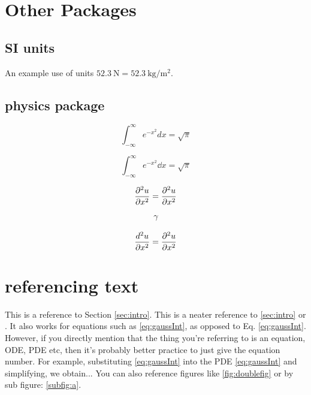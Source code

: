 \documentclass[
 reprint, %
 amsmath, amssymb, aps, %
 a4paper,
]{revtex4-2}
\begin{document}
\section{Other Packages}


\subsection{SI units}
An example use of units $\SI{52.3}{\newton}=\SI{52.3}{\kg\per\meter\squared}$.

\subsection{physics package}
\newpage
\begin{equation}
    \int_{-\infty}^\infty e^{-x^2} d x = \sqrt{\pi} \label{eq:gaussInt}
\end{equation}

\begin{equation}
    \int_{-\infty}^\infty e^{-x^2} \dd x = \sqrt{\pi}
\end{equation}

\begin{equation}
    \frac{\partial^2u}{\partial x^2} = \pdv[2]{u}{x} \label{eq:partialDiffExample}
\end{equation}

\newcommand{\myvariable}{\gamma}

\begin{align}
    \myvariable
\end{align}

\begin{equation}
    \frac{d ^2u}{\partial x^2} = \pdv[2]{u}{x} \label{eq:partialDiffExample}
\end{equation}

\section{referencing text}
\label{sec:ref}

This is a reference to Section \ref{sec:intro}. This is a neater reference to \cref{sec:intro} or .
It also works for equations such as \cref{eq:gaussInt}, as opposed to Eq. \eqref{eq:gaussInt}.
However, if you directly mention that the thing you're referring to is an equation, ODE, PDE etc, then it's probably better practice to just give the equation number. 
For example, substituting \cref{eq:gaussInt} into the PDE \eqref{eq:gaussInt} and simplifying, we obtain...
You can also reference figures like \cref{fig:doublefig} or by sub figure: \cref{subfig:a}.
\end{document}
